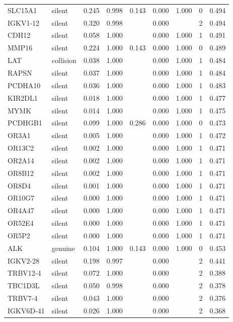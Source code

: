 \begin{longtable}{llrrrrrrr}
SLC15A1 & silent & 0.245 & 0.998 & 0.143 & 0.000 & 1.000 & 0 & 0.494\\
IGKV1-12 & silent & 0.320 & 0.998 &  & 0.000 &  & 2 & 0.494\\
CDH12 & silent & 0.058 & 1.000 &  & 0.000 & 1.000 & 1 & 0.491\\
MMP16 & silent & 0.224 & 1.000 & 0.143 & 0.000 & 1.000 & 0 & 0.489\\
LAT & collision & 0.038 & 1.000 &  & 0.000 & 1.000 & 1 & 0.484\\
RAPSN & silent & 0.037 & 1.000 &  & 0.000 & 1.000 & 1 & 0.484\\
PCDHA10 & silent & 0.036 & 1.000 &  & 0.000 & 1.000 & 1 & 0.483\\
KIR2DL1 & silent & 0.018 & 1.000 &  & 0.000 & 1.000 & 1 & 0.477\\
MYMK & silent & 0.014 & 1.000 &  & 0.000 & 1.000 & 1 & 0.475\\
PCDHGB1 & silent & 0.099 & 1.000 & 0.286 & 0.000 & 1.000 & 0 & 0.473\\
OR3A1 & silent & 0.005 & 1.000 &  & 0.000 & 1.000 & 1 & 0.472\\
OR13C2 & silent & 0.002 & 1.000 &  & 0.000 & 1.000 & 1 & 0.471\\
OR2A14 & silent & 0.002 & 1.000 &  & 0.000 & 1.000 & 1 & 0.471\\
OR8B12 & silent & 0.002 & 1.000 &  & 0.000 & 1.000 & 1 & 0.471\\
OR8D4 & silent & 0.001 & 1.000 &  & 0.000 & 1.000 & 1 & 0.471\\
OR10G7 & silent & 0.000 & 1.000 &  & 0.000 & 1.000 & 1 & 0.471\\
OR4A47 & silent & 0.000 & 1.000 &  & 0.000 & 1.000 & 1 & 0.471\\
OR52E4 & silent & 0.000 & 1.000 &  & 0.000 & 1.000 & 1 & 0.471\\
OR5P2 & silent & 0.000 & 1.000 &  & 0.000 & 1.000 & 1 & 0.471\\
ALK & genuine & 0.104 & 1.000 & 0.143 & 0.000 & 1.000 & 0 & 0.453\\
IGKV2-28 & silent & 0.198 & 0.997 &  & 0.000 &  & 2 & 0.441\\
TRBV12-4 & silent & 0.072 & 1.000 &  & 0.000 &  & 2 & 0.388\\
TBC1D3L & silent & 0.050 & 0.998 &  & 0.000 &  & 2 & 0.378\\
TRBV7-4 & silent & 0.043 & 1.000 &  & 0.000 &  & 2 & 0.376\\
IGKV6D-41 & silent & 0.026 & 1.000 &  & 0.000 &  & 2 & 0.368\\

\end{longtable}
